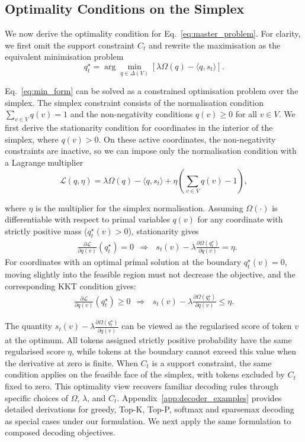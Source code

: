 \documentclass{article} %
\begin{document}
\subsection{Optimality Conditions on the Simplex}
\label{subsec:optimality_conditions}
We now derive the optimality condition for Eq.~\ref{eq:master_problem}. For clarity, we first omit the support constraint $C_t$ and rewrite the maximisation as the equivalent minimisation problem
\begin{equation}
q_t^\star
=
\arg\min_{q\in\Delta(V)}
\left[
\lambda\Omega(q)-\langle q,s_t\rangle
\right].
\label{eq:min_form}
\end{equation}

Eq.~\ref{eq:min_form} can be solved as a constrained optimisation problem over the simplex. The simplex constraint consists of the normalisation condition $\sum_{v\in V}q(v)=1$ and the non-negativity conditions $q(v)\ge 0$ for all $v\in V$. We first derive the stationarity condition for coordinates in the interior of the simplex, where $q(v)>0$. On these active coordinates, the non-negativity constraints are inactive, so we can impose only the normalisation condition with a Lagrange multiplier
\begin{equation*}
\mathcal{L}(q,\eta)
=
\lambda\Omega(q)
-
\langle q,s_t\rangle
+
\eta
\left(
\sum_{v\in V}q(v)-1
\right),
\end{equation*}

where $\eta$ is the multiplier for the simplex normalisation. 
Assuming $\Omega(\cdot)$ is differentiable with respect to primal variables $q(v)$ for any coordinate with strictly positive mass ($q^{\star}_t(v) > 0$), stationarity gives
\begin{align}\label{eq:kkt_active}
    &\frac{\partial \mathcal{L}}{\partial q(v)}(q^{\star}_t)
= 0 \ \ \Longrightarrow \ \ \ s_t(v)
-
\lambda
\frac{\partial \Omega(q_t^\star)}{\partial q(v)}
=
\eta.
\end{align}
For coordinates with an optimal primal solution at the boundary $q^{\star}_t(v) = 0$, moving slightly into the feasible region must not decrease the objective, and the corresponding KKT condition gives:
\begin{align}\label{eq:kkt_inactive}
    \frac{\partial \mathcal{L}}{\partial q(v)}(q^{\star}_t) \ge 0 \ \ \Longrightarrow \ \ \ s_t(v)
-
\lambda
\frac{\partial \Omega(q_t^\star)}{\partial q(v)}
\le
\eta.
\end{align}

The quantity $s_t(v)
-
\lambda
\frac{\partial \Omega(q_t^\star)}{\partial q(v)}$ can be viewed as the regularised score of token $v$ at the optimum. 
All tokens assigned strictly positive probability have the same regularised score $\eta$, while tokens at the boundary cannot exceed this value when the derivative at zero is finite. When $C_t$ is a support constraint, the same condition applies on the feasible face of the simplex, with tokens excluded by $C_t$ fixed to zero. This optimality view recovers familiar decoding rules through specific choices of $\Omega$, $\lambda$, and $C_t$. Appendix~\ref{app:decoder_examples} provides detailed derivations for greedy, Top-K, Top-P, softmax and sparsemax decoding as special cases under our formulation. We next apply the same formulation to composed decoding objectives.
\end{document}
